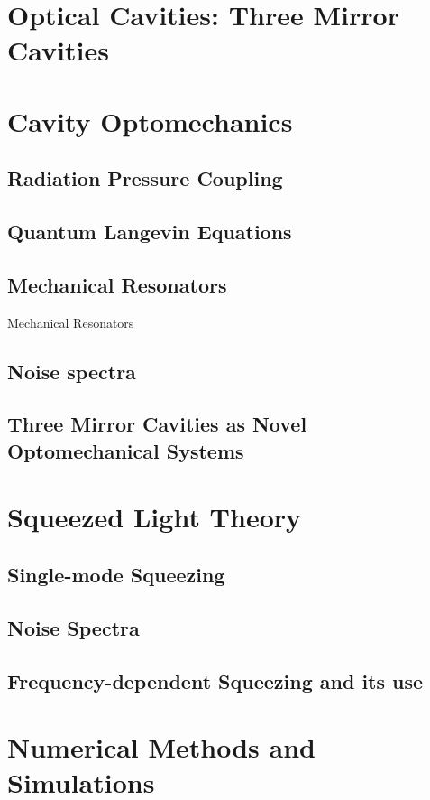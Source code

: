 \section{Optical Cavities: Three Mirror Cavities}
\subsection{}

\section{Cavity Optomechanics}
\subsection{Radiation Pressure Coupling}
\subsection{Quantum Langevin Equations}
\subsection{Mechanical Resonators}{Mechanical Resonators}
\subsection{Noise spectra}
\subsection{Three Mirror Cavities as Novel Optomechanical Systems}

\section{Squeezed Light Theory}
\subsection{Single-mode Squeezing}
\subsection{Noise Spectra }
\subsection{Frequency-dependent Squeezing and its use}

\section{Numerical Methods and Simulations}
